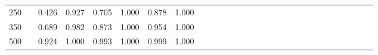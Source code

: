 % 
\begin{tabular}{ccccccccccccccccccccccccccccc}
  \hline
  \hline
250 &  & 0.426 & 0.927 & 0.705 & 1.000 & 0.878 & 1.000 &  &  &  &  &  &  &  &  &  &  &  &  &  &  &  &  &  &  &  &  &  \\ 
  350 &  & 0.689 & 0.982 & 0.873 & 1.000 & 0.954 & 1.000 &  &  &  &  &  &  &  &  &  &  &  &  &  &  &  &  &  &  &  &  &  \\ 
  500 &  & 0.924 & 1.000 & 0.993 & 1.000 & 0.999 & 1.000 &  &  &  &  &  &  &  &  &  &  &  &  &  &  &  &  &  &  &  &  &  \\ 
   \hline
\end{tabular}
